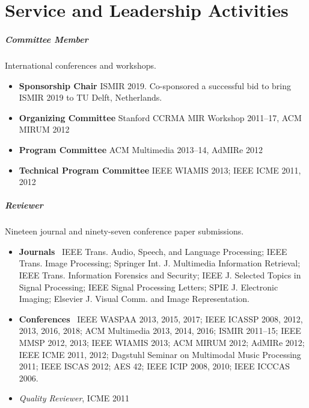 \documentclass[10pt,letterpaper]{article}
\begin{document}





\section*{Service and Leadership Activities}

\subparagraph{Committee Member} International conferences and workshops.
\begin{itemize}
    \item \textbf{Sponsorship Chair} ISMIR 2019. Co-sponsored a successful bid to bring ISMIR 2019 to TU Delft, Netherlands.
    \item \textbf{Organizing Committee} Stanford CCRMA MIR Workshop 2011--17, ACM MIRUM 2012
    \item \textbf{Program Committee} ACM Multimedia 2013--14, AdMIRe 2012
    \item \textbf{Technical Program Committee} IEEE WIAMIS 2013; IEEE ICME 2011, 2012
\end{itemize}

\subparagraph{Reviewer} Nineteen journal and ninety-seven conference paper submissions. 
\begin{itemize}
    \item \textbf{Journals} \ 
        IEEE Trans. Audio, Speech, and Language Processing;
        IEEE Trans. Image Processing; %
        Springer Int. J. Multimedia Information Retrieval; %
        IEEE Trans. Information Forensics and Security; %
        IEEE J. Selected Topics in Signal Processing; %
        IEEE Signal Processing Letters; %
        SPIE J. Electronic Imaging; %
        Elsevier J. Visual Comm. and Image Representation. %
    \item \textbf{Conferences} \ 
        IEEE WASPAA 2013, 2015, 2017; %
        IEEE ICASSP 2008, 2012, 2013, 2016, 2018; %
        ACM Multimedia 2013, 2014, 2016; %
        ISMIR 2011--15; %
        IEEE MMSP 2012, 2013; %
        IEEE WIAMIS 2013; %
        ACM MIRUM 2012; %
        AdMIRe 2012; %
        IEEE ICME 2011, 2012; %
        Dagstuhl Seminar on Multimodal Music Processing 2011; %
        IEEE ISCAS 2012; %
        AES 42; %
        IEEE ICIP 2008, 2010; %
        IEEE ICCCAS 2006. %
    \item \textit{Quality Reviewer}, ICME 2011
\end{itemize}
\end{document}
